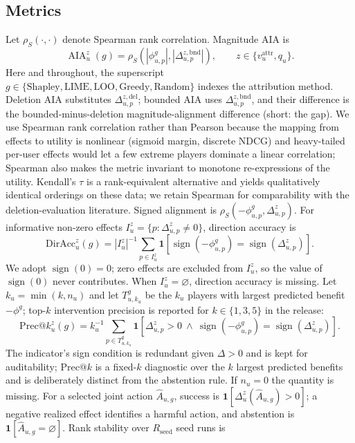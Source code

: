 \documentclass[a4paper,fleqn,doubleblind]{cas-sc}
\newcommand{\AIA}{\operatorname{AIA}}
\begin{document}
\subsection{Metrics}
Let $\rho_S(\cdot,\cdot)$ denote Spearman rank correlation. Magnitude AIA is
\begin{equation}
\AIA_u^z(g)=\rho_S(|\phi^g_{u,p}|,|\Delta_{u,p}^{z,\mathrm{bnd}}|),\qquad z\in\{v_u^{\mathrm{attr}},q_u\}.
\label{eq:aia}
\end{equation}
Here and throughout, the superscript $g\in\{\mathrm{Shapley},\mathrm{LIME},\mathrm{LOO},\mathrm{Greedy},\mathrm{Random}\}$ indexes the attribution method. Deletion AIA substitutes $\Delta_{u,p}^{z,\mathrm{del}}$; bounded AIA uses $\Delta_{u,p}^{z,\mathrm{bnd}}$, and their difference is the bounded-minus-deletion magnitude-alignment difference (short: the gap). We use Spearman rank correlation rather than Pearson because the mapping from effects to utility is nonlinear (sigmoid margin, discrete NDCG) and heavy-tailed per-user effects would let a few extreme players dominate a linear correlation; Spearman also makes the metric invariant to monotone re-expressions of the utility. Kendall's $\tau$ is a rank-equivalent alternative and yields qualitatively identical orderings on these data; we retain Spearman for comparability with the deletion-evaluation literature. Signed alignment is $\rho_S(-\phi^g_{u,p},\Delta_{u,p}^z)$. For informative non-zero effects $I_u^z=\{p:\Delta_{u,p}^z\ne0\}$, direction accuracy is
\begin{equation}
\mathrm{DirAcc}_u^z(g)=|I_u^z|^{-1}\sum_{p\in I_u^z}\mathbf{1}\left[\operatorname{sign}(-\phi^g_{u,p})=\operatorname{sign}(\Delta_{u,p}^z)\right].
\end{equation}
We adopt $\operatorname{sign}(0)=0$; zero effects are excluded from $I_u^z$, so the value of $\operatorname{sign}(0)$ never contributes. When $I_u^z=\varnothing$, direction accuracy is missing. Let $k_u=\min(k,n_u)$ and let $T_{u,k_u}^g$ be the $k_u$ players with largest predicted benefit $-\phi^g$; top-$k$ intervention precision is reported for $k\in\{1,3,5\}$ in the release:
\begin{equation}
\mathrm{Prec}@k_u^z(g)=k_u^{-1}\sum_{p\in T_{u,k_u}^g}\mathbf{1}\left[\Delta_{u,p}^z>0\ \wedge\ \operatorname{sign}(-\phi^g_{u,p})=\operatorname{sign}(\Delta_{u,p}^z)\right].
\end{equation}
The indicator's sign condition is redundant given $\Delta>0$ and is kept for auditability; $\mathrm{Prec}@k$ is a fixed-$k$ diagnostic over the $k$ largest predicted benefits and is deliberately distinct from the abstention rule. If $n_u=0$ the quantity is missing. For a selected joint action $\widehat A_{u,g}$, success is $\mathbf{1}[\Delta_u^z(\widehat A_{u,g})>0]$; a negative realized effect identifies a harmful action, and abstention is $\mathbf{1}[\widehat A_{u,g}=\varnothing]$. Rank stability over $R_{\mathrm{seed}}$ seed runs is
\end{document}
